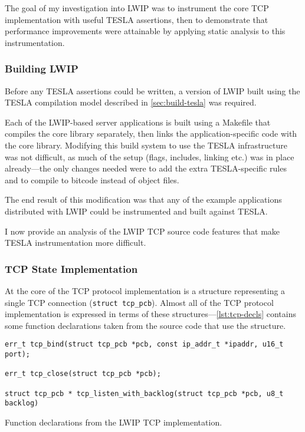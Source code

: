 The goal of my investigation into LWIP was to instrument the core TCP
implementation with useful TESLA assertions, then to demonstrate that
performance improvements were attainable by applying static analysis to
this instrumentation.

\subsubsection{Building LWIP}

Before any TESLA assertions could be written, a version of LWIP built
using the TESLA compilation model described in \autoref{sec:build-tesla}
was required.

Each of the LWIP-based server applications is built using a Makefile
that compiles the core library separately, then links the
application-specific code with the core library. Modifying this build
system to use the TESLA infrastructure was not difficult, as much of the
setup (flags, includes, linking etc.) was in place already---the only
changes needed were to add the extra TESLA-specific rules and to compile
to bitcode instead of object files.

The end result of this modification was that any of the example applications
distributed with LWIP could be instrumented and built against TESLA.

I now provide an analysis of the LWIP TCP source code features that make
TESLA instrumentation more difficult.

\subsubsection{TCP State Implementation}

At the core of the TCP protocol implementation is a structure
representing a single TCP connection (\texttt{struct tcp_pcb}).
Almost all of the TCP protocol implementation is expressed in terms of
these structures---\autoref{lst:tcp-decls} contains some function
declarations taken from the source code that use the structure.

\begin{listing}
  \begin{verbatim}
err_t tcp_bind(struct tcp_pcb *pcb, const ip_addr_t *ipaddr, u16_t port);

err_t tcp_close(struct tcp_pcb *pcb);

struct tcp_pcb * tcp_listen_with_backlog(struct tcp_pcb *pcb, u8_t backlog)
  \end{verbatim}
  \caption{Function declarations from the LWIP TCP implementation.}
  \label{lst:tcp-decls}
\end{listing}

